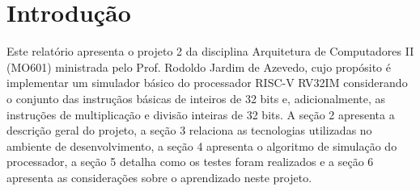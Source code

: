 \section{Introdução}

Este relatório apresenta o projeto 2 da disciplina Arquitetura de Computadores II (MO601) \space ministrada pelo Prof. Rodoldo Jardim de Azevedo, cujo propósito é implementar um simulador básico do processador RISC-V RV32IM considerando o conjunto das instruçãos básicas de inteiros de 32 bits e, adicionalmente, as instruções de multiplicação e divisão inteiras de 32 bits. A seção 2 apresenta a descrição geral do projeto, a seção 3 relaciona as tecnologias utilizadas no ambiente de desenvolvimento, a seção 4 apresenta o algoritmo de simulação do processador, a seção 5 detalha como os testes foram realizados e a seção 6 apresenta as considerações sobre o aprendizado neste projeto. 